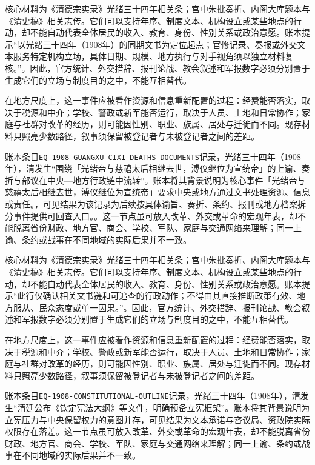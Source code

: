 核心材料为《清德宗实录》光绪三十四年相关条；宫中朱批奏折、内阁大库题本与《清史稿》相关志传。它们可以支持年序、制度文本、机构设立或某些地点的行动，却不能自动代表全体居民的收入、教育、身份、性别关系或政治意愿。账本提示“以光绪三十四年（1908年）的同期文书为定位起点；官修记录、奏报或外交文本服务特定机构立场，具体日期、规模、地方执行与对手视角须以独立材料复核。”。因此，官方统计、外交措辞、报刊论战、教会叙述和军报数字必须分别置于生成它们的立场与制度目的之中，不能互相替代。

在地方尺度上，这一事件应被看作资源和信息重新配置的过程：经费能否落实，取决于税源和中介；学校、警政或新军能否运行，取决于人员、土地和日常协作；家庭与社群对改革的经历，则可能因性别、职业、族属、居处与迁徙而不同。现存材料只照亮少数路径，叙事须保留被登记者与未被登记者之间的差距。

账本条目\texttt{EQ-1908-GUANGXU-CIXI-DEATHS-DOCUMENTS}记录，光绪三十四年（1908年），清发生“围绕「光绪帝与慈禧太后相继去世，溥仪继位为宣统帝」的上谕、奏折与部议在中央—地方行政链中流转”。账本将其背景说明为核心事件「光绪帝与慈禧太后相继去世，溥仪继位为宣统帝」要求中央或地方通过文书处理资源、信息或责任。，可见结果为该记录为后续按具体谕旨、奏折、条约、报刊或地方档案拆分事件提供可回查入口。。这一节点虽可放入改革、外交或革命的宏观年表，却不能脱离省份财政、地方官、商会、学校、军队、家庭与交通网络来理解；同一上谕、条约或战事在不同地域的实际后果并不一致。

核心材料为《清德宗实录》光绪三十四年相关条；宫中朱批奏折、内阁大库题本与《清史稿》相关志传。它们可以支持年序、制度文本、机构设立或某些地点的行动，却不能自动代表全体居民的收入、教育、身份、性别关系或政治意愿。账本提示“此行仅确认相关文书链和可追查的行政动作；不得由其直接推断政策有效、地方服从、民众态度或单一因果。”。因此，官方统计、外交措辞、报刊论战、教会叙述和军报数字必须分别置于生成它们的立场与制度目的之中，不能互相替代。

在地方尺度上，这一事件应被看作资源和信息重新配置的过程：经费能否落实，取决于税源和中介；学校、警政或新军能否运行，取决于人员、土地和日常协作；家庭与社群对改革的经历，则可能因性别、职业、族属、居处与迁徙而不同。现存材料只照亮少数路径，叙事须保留被登记者与未被登记者之间的差距。

账本条目\texttt{EQ-1908-CONSTITUTIONAL-OUTLINE}记录，光绪三十四年（1908年），清发生“清廷公布《钦定宪法大纲》等文件，明确预备立宪框架”。账本将其背景说明为立宪压力与中央保留权力的意图并存，可见结果为文本承诺与咨议局、资政院实际权限存在落差。这一节点虽可放入改革、外交或革命的宏观年表，却不能脱离省份财政、地方官、商会、学校、军队、家庭与交通网络来理解；同一上谕、条约或战事在不同地域的实际后果并不一致。

